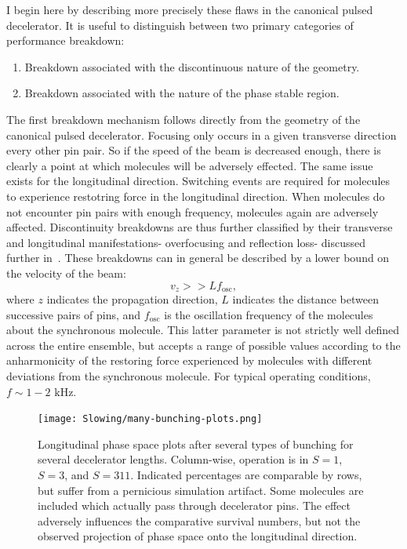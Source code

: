 I begin here by describing more precisely these flaws in the canonical pulsed decelerator.
It is useful to distinguish between two primary categories of performance breakdown:
\begin{enumerate}
\item Breakdown associated with the discontinuous nature of the geometry.
\item Breakdown associated with the nature of the phase stable region.
\end{enumerate}
The first breakdown mechanism follows directly from the geometry of the canonical pulsed decelerator. Focusing only occurs in a given transverse direction every other pin pair. So if the speed of the beam is decreased enough, there is clearly a point at which molecules will be adversely effected.
The same issue exists for the longitudinal direction. Switching events are required for molecules to experience restotring force in the longitudinal direction. When molecules do not encounter pin pairs with enough frequency, molecules again are adversely affected.
Discontinuity breakdowns are thus further classified by their transverse and longitudinal manifestations- overfocusing and reflection loss- discussed further in~\cite{Sawyer2008a}.
These breakdowns can in general be described by a lower bound on the velocity of the beam:
\begin{equation}
v_z >> Lf_\text{osc} \label{breakdownequation},
\end{equation}
where $z$ indicates the propagation direction, $L$ indicates the distance between successive pairs of pins, and $f_\text{osc}$ is the oscillation frequency of the molecules about the synchronous molecule.
This latter parameter is not strictly well defined across the entire ensemble, but accepts a range of possible values according to the anharmonicity of the restoring force experienced by molecules with different deviations from the synchronous molecule.
For typical operating conditions, $f\sim 1-2\text{ kHz}$.

\begin{figure}[t!]
\centering
\texttt{[image: Slowing/many-bunching-plots.png]}%
\caption[Phase Space for S=1, S=3, and S=311]{\label{fig:bunchingphasespace311}
Longitudinal phase space plots after several types of bunching for several decelerator lengths. Column-wise, operation is in $S=1$, $S=3$, and $S=311$. Indicated percentages are comparable by rows, but suffer from a pernicious simulation artifact. Some molecules are included which actually pass through decelerator pins. The effect adversely influences the comparative survival numbers, but not the observed projection of phase space onto the longitudinal direction.
}
\end{figure}

